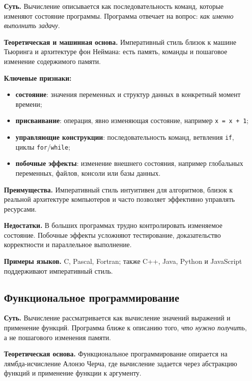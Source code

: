 \textbf{Суть.} Вычисление описывается как последовательность команд, которые изменяют состояние программы. Программа отвечает на вопрос: \textit{как именно выполнить задачу}.

\textbf{Теоретическая и машинная основа.} Императивный стиль близок к машине Тьюринга и архитектуре фон Неймана: есть память, команды и пошаговое изменение содержимого памяти.

\textbf{Ключевые признаки:}
\begin{itemize}
    \item \textbf{состояние}: значения переменных и структур данных в конкретный момент времени;
    \item \textbf{присваивание}: операция, явно изменяющая состояние, например \texttt{x = x + 1};
    \item \textbf{управляющие конструкции}: последовательность команд, ветвления \texttt{if}, циклы \texttt{for}/\texttt{while};
    \item \textbf{побочные эффекты}: изменение внешнего состояния, например глобальных переменных, файлов, консоли или базы данных.
\end{itemize}

\textbf{Преимущества.} Императивный стиль интуитивен для алгоритмов, близок к реальной архитектуре компьютеров и часто позволяет эффективно управлять ресурсами.

\textbf{Недостатки.} В больших программах трудно контролировать изменяемое состояние. Побочные эффекты усложняют тестирование, доказательство корректности и параллельное выполнение.

\textbf{Примеры языков.} C, Pascal, Fortran; также C++, Java, Python и JavaScript поддерживают императивный стиль.

\subsection*{Функциональное программирование}

\textbf{Суть.} Вычисление рассматривается как вычисление значений выражений и применение функций. Программа ближе к описанию того, \textit{что нужно получить}, а не пошагового изменения памяти.

\textbf{Теоретическая основа.} Функциональное программирование опирается на лямбда-исчисление Алонзо Черча, где вычисление задается через абстракцию функций и применение функции к аргументу.

